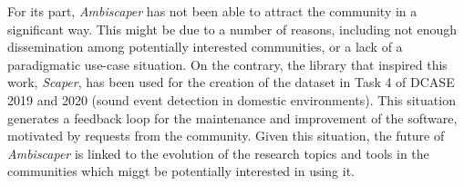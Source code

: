 For its part, \textit{Ambiscaper} has not been able to attract the community in a significant way. This might be due to a number of reasons, including not enough dissemination among potentially interested communities, or a lack of a paradigmatic use-case situation. 
On the contrary, the library that inspired this work, \textit{Scaper}, has been used for the creation of the dataset in Task 4 of DCASE 2019 and 2020 (sound event detection in domestic environments). This situation generates a feedback loop for the maintenance and improvement of the software, motivated by requests from the community.
Given this situation, the future of \textit{Ambiscaper} is linked to the evolution of the research topics and tools in the communities which miggt be potentially interested in using it. 






%
%
%
%
%
%
%
%
%
%
%
